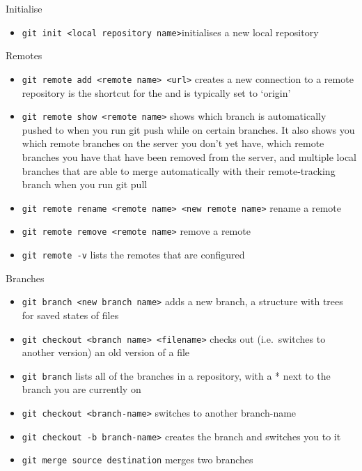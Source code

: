 \documentclass[]{book}
\providecommand{\tightlist}{%
  \setlength{\itemsep}{0pt}\setlength{\parskip}{0pt}}
\begin{document}
Initialise

\begin{itemize}
\tightlist
\item
  \texttt{git\ init\ \textless{}local\ repository\ name\textgreater{}}initialises a new local repository
\end{itemize}

Remotes

\begin{itemize}
\tightlist
\item
  \texttt{git\ remote\ add\ \textless{}remote\ name\textgreater{}\ \textless{}url\textgreater{}} creates a new connection to a remote repository is the shortcut for the and is typically set to `origin'
\item
  \texttt{git\ remote\ show\ \textless{}remote\ name\textgreater{}} shows which branch is automatically pushed to when you run git push while on certain branches. It also shows you which remote branches on the server you don't yet have, which remote branches you have that have been removed from the server, and multiple local branches that are able to merge automatically with their remote-tracking branch when you run git pull
\item
  \texttt{git\ remote\ rename\ \textless{}remote\ name\textgreater{}\ \textless{}new\ remote\ name\textgreater{}} rename a remote
\item
  \texttt{git\ remote\ remove\ \textless{}remote\ name\textgreater{}} remove a remote
\item
  \texttt{git\ remote\ -v} lists the remotes that are configured
\end{itemize}

Branches

\begin{itemize}
\tightlist
\item
  \texttt{git\ branch\ \textless{}new\ branch\ name\textgreater{}} adds a new branch, a structure with trees for saved states of files
\item
  \texttt{git\ checkout\ \textless{}branch\ name\textgreater{}\ \textless{}filename\textgreater{}} checks out (i.e.~switches to another version) an old version of a file
\item
  \texttt{git\ branch} lists all of the branches in a repository, with a * next to the branch you are currently on
\item
  \texttt{git\ checkout\ \textless{}branch-name\textgreater{}} switches to another branch-name
\item
  \texttt{git\ checkout\ -b\ branch-name\textgreater{}} creates the branch and switches you to it
\item
  \texttt{git\ merge\ source\ destination} merges two branches
\end{itemize}
\end{document}
